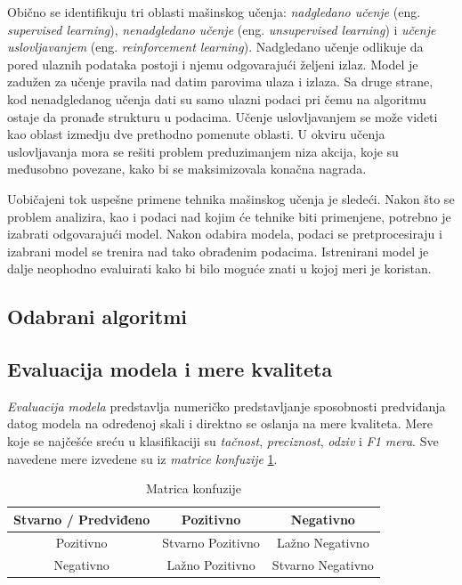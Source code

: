 \documentclass[a4paper]{article}
\theoremstyle{definition}
\begin{document}
{Obično se identifikuju tri oblasti mašinskog učenja: 
\textit{nadgledano učenje} (eng. \emph{supervised learning}), 
\textit{nenadgledano učenje} (eng. \emph{unsupervised learning}) i 
\textit{učenje uslovljavanjem} (eng. \emph{reinforcement learning}). 
Nadgledano učenje odlikuje da pored ulaznih podataka 
postoji i njemu odgovarajući željeni izlaz. Model je zadužen za učenje pravila nad 
datim parovima ulaza i izlaza. Sa druge strane, kod nenadgledanog učenja dati su 
samo ulazni podaci pri čemu na algoritmu ostaje da pronađe strukturu u podacima. 
Učenje uslovljavanjem se može videti kao oblast izmedju dve prethodno pomenute oblasti.
U okviru učenja uslovljavanja mora se rešiti problem preduzimanjem niza akcija,
koje su međusobno povezane, kako bi se maksimizovala konačna nagrada.

Uobičajeni tok uspešne primene tehnika mašinskog učenja je sledeći. Nakon što se 
problem analizira, kao i podaci nad kojim će tehnike biti primenjene, potrebno je 
izabrati odgovarajući model. Nakon odabira modela, podaci se pretprocesiraju i 
izabrani model se trenira nad tako obrađenim podacima. Istrenirani model je dalje 
neophodno evaluirati kako bi bilo moguće znati u kojoj meri je koristan.

\subsection{Odabrani algoritmi}



\subsection{Evaluacija modela i mere kvaliteta}


\textit{Evaluacija modela} predstavlja numeričko predstavljanje sposobnosti 
predviđanja datog modela na određenoj skali i direktno se oslanja na mere 
kvaliteta. Mere koje se najčešće sreću u klasifikaciji su \textit{tačnost}, 
\textit{preciznost}, \textit{odziv} i \textit{F1 mera}. Sve navedene mere 
izvedene su iz \textit{matrice konfuzije} \ref{table:matrica_konfuzije}.

\begin{table}[h]
	\centering
	\begin{tabular}{ |c|cc| } 
		\hline
		Stvarno / Predviđeno & Pozitivno & Negativno \\ 
		\hline
		Pozitivno & Stvarno Pozitivno & Lažno Negativno \\ 
		Negativno & Lažno Pozitivno & Stvarno Negativno \\ 
		\hline
	\end{tabular}
	\caption{Matrica konfuzije}
	\label{table:matrica_konfuzije}
\end{table}

}
\end{document}
